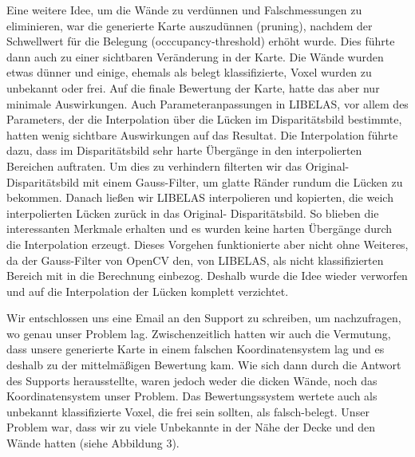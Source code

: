 \documentclass[12pt,titlepage, a4paper]{article}
\begin{document}
Eine weitere Idee, um die Wände zu verdünnen und Falschmessungen zu eliminieren, war die generierte Karte auszudünnen (pruning), nachdem der Schwellwert für die Belegung (occcupancy-threshold) erhöht wurde. Dies führte dann auch zu einer sichtbaren Veränderung in der Karte. Die Wände wurden etwas dünner und einige, ehemals als belegt klassifizierte, Voxel wurden zu unbekannt oder frei. Auf die finale Bewertung der Karte, hatte das aber nur minimale Auswirkungen. Auch Parameteranpassungen in LIBELAS, vor allem des Parameters, der die Interpolation über die Lücken im Disparitätsbild bestimmte, hatten wenig sichtbare Auswirkungen auf das Resultat. Die Interpolation führte dazu, dass im Disparitätsbild sehr harte Übergänge in den interpolierten Bereichen auftraten. Um dies zu verhindern filterten wir das Original-Disparitätsbild mit einem Gauss-Filter, um glatte Ränder rundum die Lücken zu bekommen. Danach ließen wir LIBELAS interpolieren und kopierten, die weich interpolierten Lücken zurück in das Original-
Disparitätsbild. So blieben die interessanten Merkmale erhalten und es wurden keine harten Übergänge durch die Interpolation erzeugt. Dieses Vorgehen funktionierte aber nicht ohne Weiteres, da der Gauss-Filter von OpenCV den, von LIBELAS, als nicht klassifizierten Bereich mit in die Berechnung einbezog. Deshalb wurde die Idee wieder verworfen und auf die Interpolation der Lücken komplett verzichtet.

Wir entschlossen uns eine Email an den Support zu schreiben, um nachzufragen, wo genau unser Problem lag.
Zwischenzeitlich hatten wir auch die Vermutung, dass unsere generierte Karte in einem falschen Koordinatensystem lag und es deshalb zu der mittelmäßigen Bewertung kam.
Wie sich dann durch die Antwort des Supports herausstellte, waren jedoch weder die dicken Wände, noch das Koordinatensystem unser Problem. Das Bewertungssystem wertete auch als unbekannt klassifizierte Voxel, die frei sein sollten, als falsch-belegt. Unser Problem war, dass wir zu viele Unbekannte in der Nähe der Decke und den Wände hatten (siehe Abbildung 3).
\end{document}
